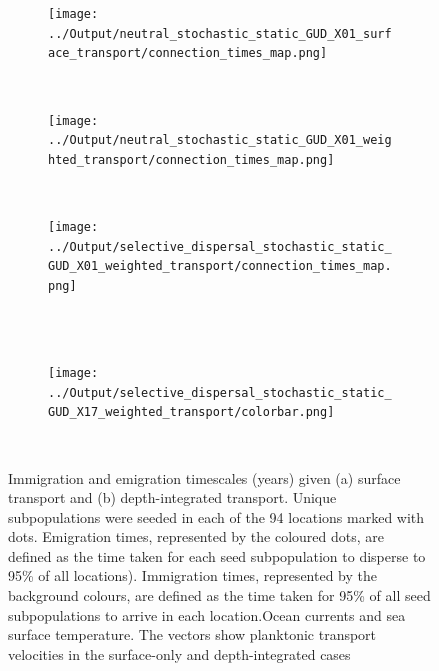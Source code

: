 \documentclass[12pt]{article}
\begin{document}
\begin{figure}[htp]
        \centering
\begin{subfigure}{.66\textwidth}
        \centering
        \texttt{[image: ../Output/neutral\_stochastic\_static\_GUD\_X01\_surface\_transport/connection\_times\_map.png]}
    \end{subfigure}%
\\
\begin{subfigure}{.66\textwidth}
        \centering
         \texttt{[image: ../Output/neutral\_stochastic\_static\_GUD\_X01\_weighted\_transport/connection\_times\_map.png]}
    \end{subfigure}%
    \\
\begin{subfigure}{.66\textwidth}
        \centering
         \texttt{[image: ../Output/selective\_dispersal\_stochastic\_static\_GUD\_X01\_weighted\_transport/connection\_times\_map.png]}
    \end{subfigure}%
    \\~\\
\begin{subfigure}{.66\textwidth}
        \centering
         \texttt{[image: ../Output/selective\_dispersal\_stochastic\_static\_GUD\_X17\_weighted\_transport/colorbar.png]}
    \end{subfigure}%
    \\
    \caption{Immigration and emigration timescales (years) given (a) surface transport and (b) depth-integrated transport. Unique subpopulations were seeded in each of the 94 locations marked with dots. Emigration times, represented by the coloured dots, are defined as the time taken for each seed subpopulation to disperse to 95\% of all locations). Immigration times, represented by the background colours, are defined as the time taken for 95\% of all seed subpopulations to arrive in each location.Ocean currents and sea surface temperature. The vectors show planktonic transport velocities in the surface-only and depth-integrated cases}
\label{Imm_vs_em}
\end{figure}
\end{document}
